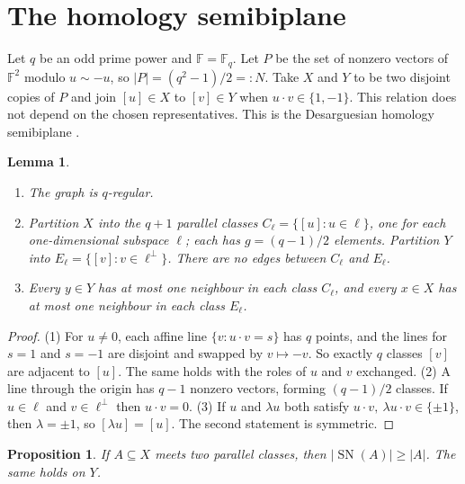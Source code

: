 \documentclass[11pt]{amsart}
\newtheorem{lemma}[theorem]{Lemma}
\newtheorem{proposition}[theorem]{Proposition}
\theoremstyle{definition}
\theoremstyle{remark}
\newcommand{\F}{\mathbb{F}}
\newcommand{\sn}{\operatorname{SN}}
\begin{document}
\section{The homology semibiplane}\label{sec:semibiplane}

Let $q$ be an odd prime power and $\F=\F_q$. Let $P$ be the set of nonzero vectors of
$\F^2$ modulo $u\sim-u$, so $|P|=(q^2-1)/2=:N$. Take $X$ and $Y$ to be two disjoint copies
of $P$ and join $[u]\in X$ to $[v]\in Y$ when $u\cdot v\in\{1,-1\}$. This relation does not
depend on the chosen representatives. This is the Desarguesian homology semibiplane
\cite[\S\S1--2]{Moorhouse}.

\begin{lemma}\label{lem:sb-basic}
\begin{enumerate}
\item The graph is $q$-regular.
\item Partition $X$ into the $q+1$ parallel classes $C_\ell=\{[u]:u\in\ell\}$, one for
each one-dimensional subspace $\ell$; each has $g=(q-1)/2$ elements. Partition $Y$ into
$E_\ell=\{[v]:v\in\ell^\perp\}$. There are no edges between $C_\ell$ and $E_\ell$.
\item Every $y\in Y$ has at most one neighbour in each class $C_\ell$, and every $x\in X$
has at most one neighbour in each class $E_\ell$.
\end{enumerate}
\end{lemma}

\begin{proof}
(1) For $u\ne0$, each affine line $\{v:u\cdot v=s\}$ has $q$ points, and the lines for
$s=1$ and $s=-1$ are disjoint and swapped by $v\mapsto-v$. So exactly $q$ classes $[v]$
are adjacent to $[u]$. The same holds with the roles of $u$ and $v$ exchanged.
(2) A line through the origin has $q-1$ nonzero vectors, forming $(q-1)/2$ classes. If
$u\in\ell$ and $v\in\ell^\perp$ then $u\cdot v=0$.
(3) If $u$ and $\lambda u$ both satisfy $u\cdot v,\ \lambda u\cdot v\in\{\pm1\}$, then
$\lambda=\pm1$, so $[\lambda u]=[u]$. The second statement is symmetric.
\end{proof}

\begin{proposition}\label{prop:sb-hall}
If $A\subseteq X$ meets two parallel classes, then $|\sn(A)|\ge|A|$. The same holds on $Y$.
\end{proposition}
\end{document}
